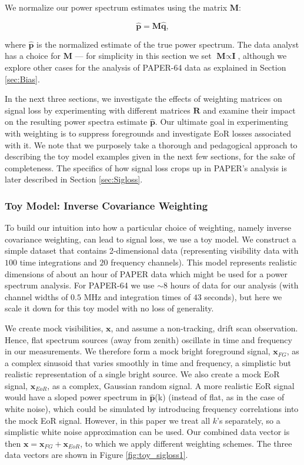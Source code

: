 \documentclass[preprint2,numberedappendix,tighten]{aastex6}  %
\begin{document}
We normalize our power spectrum estimates using the matrix $\textbf{M}$:

\begin{equation}
\label{eq:phat}
\hat{\textbf{p}} = \textbf{M}\hat{\textbf{q}},
\end{equation}

\noindent where $\hat{\textbf{p}}$ is the normalized estimate of the true power spectrum. The data analyst has a choice for $\textbf{M}$ --- for simplicity in this section we set $\textbf{M} \propto \textbf{I}$, although we explore other cases for the analysis of PAPER-64 data as explained in Section \ref{sec:Bias}.

In the next three sections, we investigate the effects of weighting matrices on signal loss by experimenting with different matrices $\textbf{R}$ and examine their impact on the resulting power spectra estimate $\hat{\textbf{p}}$. Our ultimate goal in experimenting with weighting is to suppress foregrounds and investigate EoR losses associated with it. We note that we purposely take a thorough and pedagogical approach to describing the toy model examples given in the next few sections, for the sake of completeness. The specifics of how signal loss crops up in PAPER's analysis is later described in Section \ref{sec:Sigloss}.

\subsubsection{Toy Model: Inverse Covariance Weighting}
\label{sec:toymodel}

To build our intuition into how a particular choice of weighting, namely inverse covariance weighting, can lead to signal loss, we use a toy model. We construct a simple dataset that contains 2-dimensional data (representing visibility data with $100$ time integrations and $20$ frequency channels). This model represents realistic dimensions of about an hour of PAPER data which might be used for a power spectrum analysis. For PAPER-64 we use $\sim$$8$ hours of data for our analysis (with channel widths of $0.5$ MHz and integration times of $43$ seconds), but here we scale it down for this toy model with no loss of generality. 

We create mock visibilities, $\textbf{x}$, and assume a non-tracking, drift scan observation. Hence, flat spectrum sources (away from zenith) oscillate in time and frequency in our measurements. We therefore form a mock bright foreground signal, $\textbf{x}_{FG}$, as a complex sinusoid that varies smoothly in time and frequency, a simplistic but realistic representation of a single bright source. We also create a mock EoR signal, $\textbf{x}_{EoR}$, as a complex, Gaussian random signal. A more realistic EoR signal would have a sloped power spectrum in $\hat{\textbf{p}}$(k) (instead of flat, as in the case of white noise), which could be simulated by introducing frequency correlations into the mock EoR signal. However, in this paper we treat all $k$'s separately, so a simplistic white noise approximation can be used. Our combined data vector is then $\textbf{x} = \textbf{x}_{FG} + \textbf{x}_{EoR}$, to which we apply different weighting schemes. The three data vectors are shown in Figure \ref{fig:toy_sigloss1}. 
\end{document}
